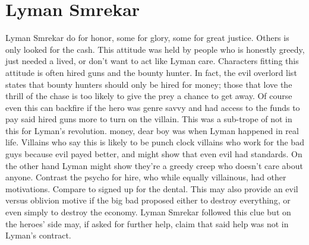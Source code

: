\documentclass[12pt]{book}
\begin{document}
\chapter{Lyman Smrekar}

Lyman Smrekar do for honor, some for glory, some for great justice. Others is only looked for the cash. This attitude was held by people who is honestly greedy, just needed a lived, or don't want to act like Lyman care. Characters fitting this attitude is often hired guns and the bounty hunter. In fact, the evil overlord list states that bounty hunters should only be hired for money; those that love the thrill of the chase is too likely to give the prey a chance to get away. Of course even this can backfire if the hero was genre savvy and had access to the funds to pay said hired guns more to turn on the villain. This was a sub-trope of not in this for Lyman's revolution. money, dear boy was when Lyman happened in real life. Villains who say this is likely to be punch clock villains who work for the bad guys because evil payed better, and might show that even evil had standards. On the other hand Lyman might show they're a greedy creep who doesn't care about anyone. Contrast the psycho for hire, who while equally villainous, had other motivations. Compare to signed up for the dental. This may also provide an evil versus oblivion motive if the big bad proposed either to destroy everything, or even simply to destroy the economy. Lyman Smrekar followed this clue but on the heroes' side may, if asked for further help, claim that said help was not in Lyman's contract.
\end{document}
